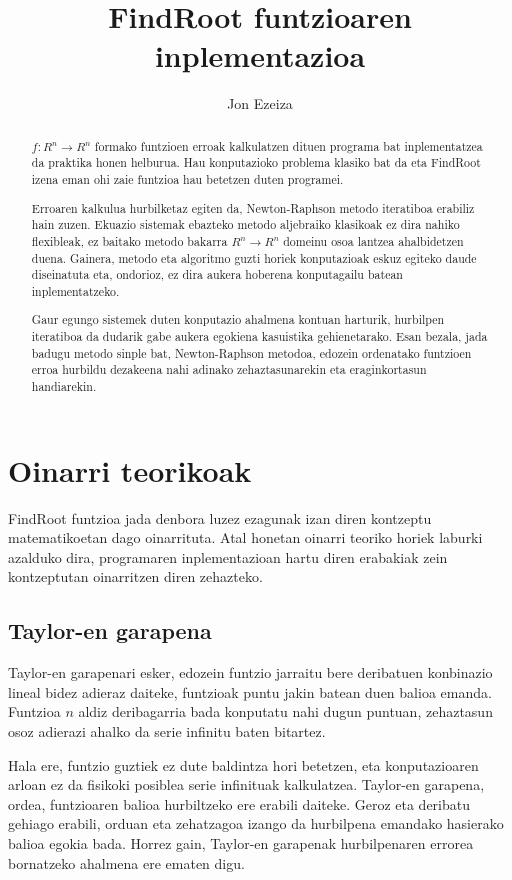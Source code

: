 \documentclass[10pt,a4paper,basque]{article}
\author{Jon Ezeiza}
\title{FindRoot funtzioaren inplementazioa}
\begin{document}
\maketitle

\begin{abstract}
$f: R^n \rightarrow R^n$ formako funtzioen erroak kalkulatzen dituen programa bat inplementatzea da praktika honen helburua. Hau konputazioko problema klasiko bat da eta FindRoot izena eman ohi zaie funtzioa hau betetzen duten programei.

Erroaren kalkulua hurbilketaz egiten da, Newton-Raphson metodo iteratiboa erabiliz hain zuzen. Ekuazio sistemak ebazteko metodo aljebraiko klasikoak ez dira nahiko flexibleak, ez baitako metodo bakarra $R^n \rightarrow R^n$ domeinu osoa lantzea ahalbidetzen duena. Gainera, metodo eta algoritmo guzti horiek konputazioak eskuz egiteko daude diseinatuta eta, ondorioz, ez dira aukera hoberena konputagailu batean inplementatzeko.

Gaur egungo sistemek duten konputazio ahalmena kontuan harturik, hurbilpen iteratiboa da dudarik gabe aukera egokiena kasuistika gehienetarako. Esan bezala, jada badugu metodo sinple bat, Newton-Raphson metodoa, edozein ordenatako funtzioen erroa hurbildu dezakeena nahi adinako zehaztasunarekin eta eraginkortasun handiarekin. 
\end{abstract}

\section{Oinarri teorikoak}
FindRoot funtzioa jada denbora luzez ezagunak izan diren kontzeptu matematikoetan dago oinarrituta. Atal honetan oinarri teoriko horiek laburki azalduko dira, programaren inplementazioan hartu diren erabakiak zein kontzeptutan oinarritzen diren zehazteko.

\subsection{Taylor-en garapena}

Taylor-en garapenari esker, edozein funtzio jarraitu bere deribatuen konbinazio lineal bidez adieraz daiteke, funtzioak puntu jakin batean duen balioa emanda. Funtzioa $n$ aldiz deribagarria bada konputatu nahi dugun puntuan, zehaztasun osoz adierazi ahalko da serie infinitu baten bitartez.

Hala ere, funtzio guztiek ez dute baldintza hori betetzen, eta konputazioaren arloan ez da fisikoki posiblea serie infinituak kalkulatzea. Taylor-en garapena, ordea, funtzioaren balioa hurbiltzeko ere erabili daiteke. Geroz eta deribatu gehiago erabili, orduan eta zehatzagoa izango da hurbilpena emandako hasierako balioa egokia bada. Horrez gain, Taylor-en garapenak  hurbilpenaren errorea bornatzeko ahalmena ere ematen digu.
\end{document}
